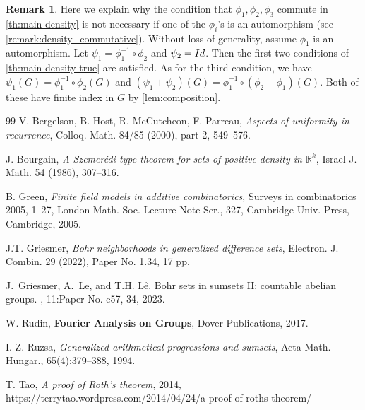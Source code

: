 \documentclass[10pt]{article}
\theoremstyle{definition}
\newtheorem{remark}{Remark}
\newcommand{\R}{\mathbb{R}}
\begin{document}
\setcounter{remark}{5}
\begin{remark} \label{rk:auto}
Here we explain why the condition that $\phi_1, \phi_2, \phi_3$ commute in \cref{th:main-density} is not necessary if one of the $\phi_i$'s is an automorphism (see \cref{remark:density_commutative}). Without loss of generality, assume $\phi_1$ is an automorphism. Let $\psi_1 = \phi_1^{-1} \circ \phi_2$ and $\psi_2 = \textup{Id}$. Then the first two conditions of \cref{th:main-density-true} are satisfied. As for the third condition, we have $\psi_1(G) = \phi_1^{-1} \circ \phi_2(G)$ and $(\psi_1 + \psi_2)(G) = \phi_1^{-1} \circ (\phi_2 + \phi_1) (G)$. Both of these have finite index in $G$ by \cref{lem:composition}.
\end{remark}
\begin{thebibliography}{99}
V. Bergelson, B. Host, R. McCutcheon, F. Parreau, \emph{Aspects of uniformity in recurrence}, Colloq. Math. 84/85 (2000), part 2, 549--576.  

J. Bourgain, \emph{A Szemer\'edi type theorem for sets of positive density in $\R^k$}, Israel J. Math. 54 (1986), 307--316. 


B. Green, \emph{Finite field models in additive combinatorics}, Surveys in combinatorics 2005, 1--27,
London Math. Soc. Lecture Note Ser., 327, Cambridge Univ. Press, Cambridge, 2005. 

J.T. Griesmer, \emph{Bohr neighborhoods in generalized difference sets}, Electron. J. Combin. 29 (2022), Paper No. 1.34, 17 pp.

J.~Griesmer, A.~Le, and T.H. L\^{e}.
\newblock Bohr sets in sumsets {II}: countable abelian groups.
, 11:Paper No. e57, 34, 2023.

W. Rudin, \textbf{Fourier Analysis on Groups}, Dover Publications, 2017.


 I. Z. Ruzsa, \emph{Generalized arithmetical progressions and sumsets}, Acta Math. Hungar., 65(4):379--388, 1994. 

T. Tao, \emph{A proof of Roth's theorem}, 2014, https://terrytao.wordpress.com/2014/04/24/a-proof-of-roths-theorem/

\end{thebibliography}
\end{document}
